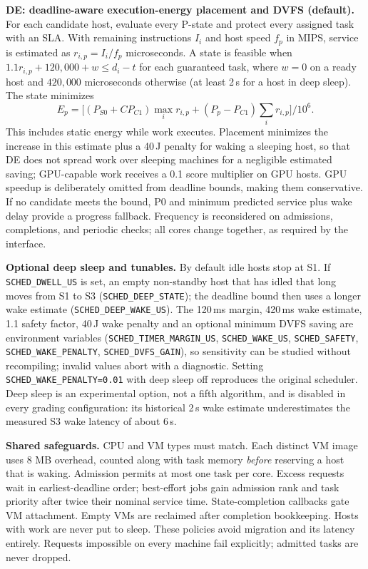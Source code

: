 \documentclass[10pt,letterpaper]{article}
\begin{document}
\textbf{DE: deadline-aware execution-energy placement and DVFS (default).} For
each candidate host, evaluate every P-state and protect every assigned task with
an SLA. With remaining instructions $I_i$ and host speed $f_p$ in MIPS, service
is estimated as $r_{i,p}=I_i/f_p$ microseconds. A state is feasible when
$1.1r_{i,p}+120{,}000+w\le d_i-t$ for each guaranteed task, where $w=0$ on a ready
host and $420{,}000$ microseconds otherwise (at least 2\,s for a host in deep sleep). The state minimizes
\[
 E_p=\big[(P_{S0}+C P_{C1})\max_i r_{i,p}
             +(P_p-P_{C1})\sum_i r_{i,p}\big]/10^6.
\]
This includes static energy while work executes. Placement minimizes the increase
in this estimate plus a 40\,J penalty for waking a sleeping host, so that DE does not spread work over sleeping machines for a negligible estimated saving; GPU-capable work receives a 0.1 score multiplier on GPU hosts.
GPU speedup is deliberately omitted from deadline bounds, making them conservative.
If no candidate meets the bound, P0 and minimum predicted service plus wake delay
provide a progress fallback. Frequency is reconsidered on admissions, completions,
and periodic checks; all cores change together, as required by the interface.

\textbf{Optional deep sleep and tunables.} By default idle hosts stop at S1. If \texttt{SCHED\_DWELL\_US} is set, an empty non-standby host that has idled that long moves from S1 to S3 (\texttt{SCHED\_DEEP\_STATE}); the deadline bound then uses a longer wake estimate (\texttt{SCHED\_DEEP\_WAKE\_US}). The 120\,ms margin, 420\,ms wake estimate, 1.1 safety factor, 40\,J wake penalty and an optional minimum DVFS saving are environment variables (\texttt{SCHED\_TIMER\_MARGIN\_US}, \texttt{SCHED\_WAKE\_US}, \texttt{SCHED\_SAFETY}, \texttt{SCHED\_WAKE\_PENALTY}, \texttt{SCHED\_DVFS\_GAIN}), so sensitivity can be studied without recompiling; invalid values abort with a diagnostic. Setting \texttt{SCHED\_WAKE\_PENALTY=0.01} with deep sleep off reproduces the original scheduler.
Deep sleep is an experimental option, not a fifth algorithm, and is disabled in every
grading configuration: its historical 2\,s wake estimate underestimates the measured
S3 wake latency of about 6\,s.

\textbf{Shared safeguards.} CPU and VM types must match. Each distinct VM image
uses 8 MB overhead, counted along with task memory \emph{before} reserving a host
that is waking. Admission permits at most one task per core. Excess requests wait
in earliest-deadline order; best-effort jobs gain admission rank and task priority
after twice their nominal service time. State-completion callbacks gate VM
attachment. Empty VMs are reclaimed after completion bookkeeping. Hosts with work
are never put to sleep. These policies avoid migration and its latency entirely.
Requests impossible on every machine fail explicitly; admitted tasks are never dropped.
\end{document}
